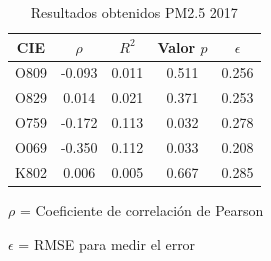 \documentclass[3p,times]{elsarticle}
\begin{document}
\begin{table}[hbt!]
\centering
\caption{Resultados obtenidos PM2.5 2017}
\label{tab:Resultados obtenidos PM2.5 2017}
\vspace{0.5cm}
\begin{threeparttable}
\begin{tabular}{|c|c|c|c|c|}
	\hline
	CIE & $\rho$ & $R^2$ & Valor $p$ & $\epsilon$\\
	\hline
	O809 & -0.093 & 0.011 & 0.511 & 0.256 \\
	\hline
	O829 & 0.014 & 0.021 & 0.371 & 0.253 \\
	\hline
	O759 & -0.172 & 0.113 & 0.032 & 0.278 \\
	\hline
	O069 & -0.350 & 0.112 & 0.033 & 0.208 \\
	\hline
	K802 & 0.006 & 0.005 & 0.667 & 0.285 \\
	\hline
\end{tabular}
\begin{tablenotes}
\footnotesize
\item{$\rho$ = Coeficiente de correlación de Pearson}
\item{$\epsilon$ = RMSE para medir el error}
\end{tablenotes}
\end{threeparttable}
\end{table}
\end{document}
